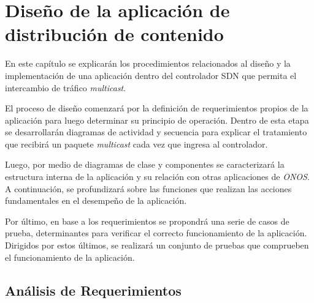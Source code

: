 
\chapter{Diseño de la aplicación de distribución de contenido} %
\label{Chapter5} %


En este capítulo se explicarán los procedimientos relacionados al diseño y la implementación de una aplicación dentro del controlador SDN que permita el intercambio de tráfico \textit{multicast}. \

El proceso de diseño comenzará por la definición de requerimientos propios de la aplicación para luego determinar su principio de operación.
Dentro de esta etapa se desarrollarán diagramas de actividad y secuencia para explicar el tratamiento que recibirá un paquete \textit{multicast} cada vez que ingresa al controlador. \

Luego, por medio de diagramas de clase y componentes se caracterizará la estructura interna de la aplicación y su relación con otras aplicaciones de \textit{ONOS}. A continuación, 
se profundizará sobre las funciones que realizan las acciones fundamentales en el desempeño de la aplicación.\

Por último, en base a los requerimientos se propondrá una serie de casos de prueba, determinantes para verificar el correcto funcionamiento de la aplicación. Dirigidos por 
estos últimos, se realizará un conjunto de pruebas que comprueben el funcionamiento de la aplicación.

\section{Análisis de Requerimientos}

